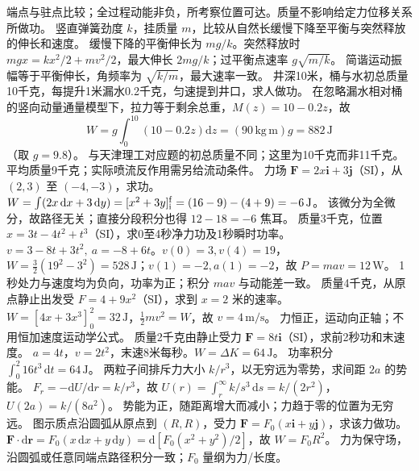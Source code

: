 \crosscheck 端点与驻点比较；全过程动能非负，所考察位置可达。质量不影响给定力位移关系所做功。
\problemtext 竖直弹簧劲度 $k$，挂质量 $m$，比较从自然长缓慢下降至平衡与突然释放的伸长和速度。
\workings 缓慢下降的平衡伸长为 $mg/k$。突然释放时 $mgx=kx^2/2+mv^2/2$，最大伸长 $2mg/k$；过平衡点速率 $g\sqrt{m/k}$。
\crosscheck 简谐运动振幅等于平衡伸长，角频率为 $\sqrt{k/m}$，最大速率一致。
\problemtext 井深10米，桶与水初总质量10千克，每提升1米漏水0.2千克，匀速提到井口，求人做功。
\workings 在忽略漏水相对桶的竖向动量通量模型下，拉力等于剩余总重，$M(z)=10-0.2z$，故
\[
W=g\int_0^{10}(10-0.2z)\mathrm dz=(90\,\mathrm{kg\,m})g=882\,\mathrm J
\]
（取 $g=9.8$）。
\crosscheck 与天津理工对应题的初总质量不同；这里为10千克而非11千克。平均质量9千克；实际喷流反作用需另给流动条件。
\problemtext 力场 $\bm F=2x\bm i+3\bm j$（SI），从 $(2,3)$ 至 $(-4,-3)$，求功。
\workings $W=\int(2x\,\mathrm dx+3\,\mathrm dy)=[x^2+3y]_{\rm i}^{\rm f}=(16-9)-(4+9)=-6\,\mathrm J$。
\crosscheck 该微分为全微分，故路径无关；直接分段积分也得 $12-18=-6$ 焦耳。
\problemtext 质量3千克，位置 $x=3t-4t^2+t^3$（SI），求0至4秒净力功及1秒瞬时功率。
\workings $v=3-8t+3t^2,\ a=-8+6t$。$v(0)=3,v(4)=19$，$W=\frac32(19^2-3^2)=528\,\mathrm J$；$v(1)=-2,a(1)=-2$，故 $P= mav=12\,\mathrm W$。
\crosscheck 1秒处力与速度均为负向，功率为正；积分 $mav$ 与动能差一致。
\problemtext 质量4千克，从原点静止出发受 $F=4+9x^2$（SI），求到 $x=2$ 米的速率。
\workings $W=[4x+3x^3]_0^2=32\,\mathrm J$，$\frac12mv^2=W$，故 $v=4\,\mathrm{m/s}$。
\crosscheck 力恒正，运动向正轴；不用恒加速度运动学公式。
\problemtext 质量2千克由静止受力 $\bm F=8t\bm i$（SI），求前2秒功和末速度。
\workings $a=4t$，$v=2t^2$，末速8米每秒。$W=\Delta K=64\,\mathrm J$。
\crosscheck 功率积分 $\int_0^2 16t^3\,\mathrm dt=64\,\mathrm J$。
\problemtext 两粒子间排斥力大小 $k/r^3$，以无穷远为零势，求间距 $2a$ 的势能。
\workings $F_r=-\mathrm dU/\mathrm dr=k/r^3$，故 $U(r)=\int_r^\infty k/s^3\,\mathrm ds=k/(2r^2)$，$U(2a)=k/(8a^2)$。
\crosscheck 势能为正，随距离增大而减小；力趋于零的位置为无穷远。
\problemtext 图示质点沿圆弧从原点到 $(R,R)$，受力 $\bm F=F_0(x\bm i+y\bm j)$，求该力做功。
\workings $\bm F\cdot\mathrm d\bm r=F_0(x\,\mathrm dx+y\,\mathrm dy)=\mathrm d[F_0(x^2+y^2)/2]$，故 $W=F_0R^2$。
\crosscheck 力为保守场，沿圆弧或任意同端点路径积分一致；$F_0$ 量纲为力/长度。

